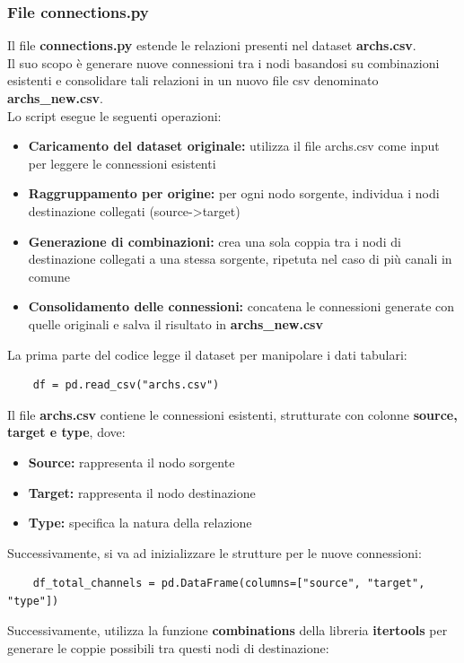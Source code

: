 \documentclass[12pt]{article}
\begin{document}
	\subsubsection{File connections.py}
	Il file \textbf{connections.py} estende le relazioni presenti nel dataset \textbf{archs.csv}.\\
	Il suo scopo è generare nuove connessioni tra i nodi basandosi su combinazioni esistenti e consolidare tali relazioni in un nuovo file csv denominato \textbf{archs\_new.csv}.\\
	Lo script esegue le seguenti operazioni:
	\begin{itemize}[label=]
		\item \textbf{Caricamento del dataset originale:} utilizza il file archs.csv come input per leggere le connessioni esistenti
		\item \textbf{Raggruppamento per origine:} per ogni nodo sorgente, individua i nodi destinazione collegati (source->target)
		\item \textbf{Generazione di combinazioni:} crea una sola coppia tra i nodi di destinazione collegati a una stessa sorgente, ripetuta nel caso di più canali in comune
		\item \textbf{Consolidamento delle connessioni:} concatena le connessioni generate con quelle originali e salva il risultato in \textbf{archs\_new.csv}
	\end{itemize}
	La prima parte del codice legge il dataset per manipolare i dati tabulari:
	\begin{lstlisting}
	df = pd.read_csv("archs.csv")
	\end{lstlisting}
	Il file \textbf{archs.csv} contiene le connessioni esistenti, strutturate con colonne \textbf{source, target e type}, dove:
	\begin{itemize}[label=]
		\item \textbf{Source:} rappresenta il nodo sorgente
		\item \textbf{Target:} rappresenta il nodo destinazione
		\item \textbf{Type:} specifica la natura della relazione
	\end{itemize}
	Successivamente, si va ad inizializzare le strutture per le nuove connessioni:
	\begin{lstlisting}	
	df_total_channels = pd.DataFrame(columns=["source", "target", "type"])
	\end{lstlisting}
	Successivamente, utilizza la funzione \textbf{combinations} della libreria \textbf{itertools} per generare le coppie possibili tra questi nodi di destinazione:
\end{document}
